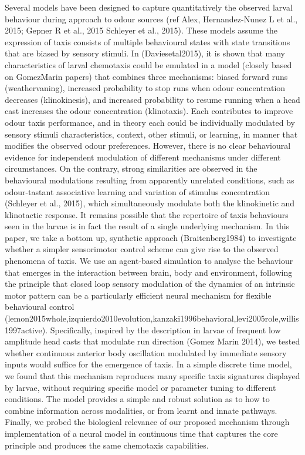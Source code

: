 \documentclass[10pt,a4paper]{article}
\begin{document}
Several models have been designed to capture quantitatively the observed larval behaviour during approach to odour sources (ref Alex, Hernandez-Nunez L et al., 2015; Gepner R et al., 2015 Schleyer et al., 2015). These models assume the expression of taxis consists of multiple behavioural states with state transitions that are biased by sensory stimuli. In (Daviesetal2015), it is shown that many characteristics of larval chemotaxis could be emulated in a model (closely based on GomezMarin papers) that combines three mechanisms: biased forward runs (weathervaning), increased probability to stop runs when odour concentration decreases (klinokinesis), and increased probability to resume running when a head cast increases the odour concentration (klinotaxis). Each contributes to improve odour taxis performance, and in theory each could be individually modulated by sensory stimuli characteristics, context, other stimuli, or learning, in manner that modifies the observed odour preferences. However, there is no clear behavioural evidence for independent modulation of different mechanisms under different circumstances. On the contrary, strong similarities are observed in the behavioural modulations resulting from apparently unrelated conditions, such as odour-tastant associative learning and variation of stimulus concentration (Schleyer et al., 2015), which simultaneously modulate both the klinokinetic and klinotactic response.
It remains possible that the repertoire of taxis behaviours seen in the larvae is in fact the result of a single underlying mechanism. In this paper, we take a bottom up, synthetic approach (Braitenberg1984) to investigate whether a simpler sensorimotor control scheme can give rise to the observed phenomena of taxis.  We use an agent-based simulation to analyse the behaviour that emerges in the interaction between brain, body and environment, following the principle that closed loop sensory modulation of the dynamics of an intrinsic motor pattern can be a particularly efficient neural mechanism for flexible behavioural control (lemon2015whole,izquierdo2010evolution,kanzaki1996behavioral,levi2005role,willis1997active). Specifically, inspired by the description in larvae of frequent low amplitude head casts that modulate run direction (Gomez Marin 2014), we tested whether continuous anterior body oscillation modulated by immediate sensory inputs would suffice for the emergence of taxis. In a simple discrete time model, we found that this mechanism reproduces many specific taxis signatures displayed by larvae, without requiring specific model or parameter tuning to different conditions. The model provides a simple and robust solution as to how to combine information across modalities, or from learnt and innate pathways. Finally, we probed the biological relevance of our proposed mechanism through implementation of a neural model in continuous time that captures the core principle and produces the same chemotaxis capabilities.
\end{document}

